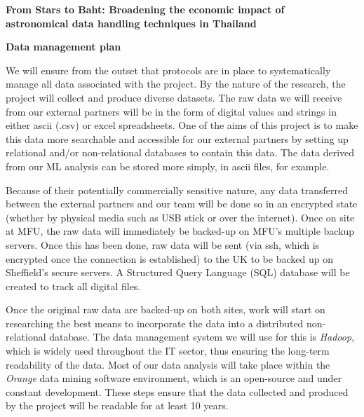 \documentclass[11pt]{article}
\begin{document}
\setcounter{figure}{0}
\noindent
{\LARGE \bf From Stars to Baht: Broadening the economic impact of \\
astronomical data handling techniques in Thailand}

\vspace{3mm}
\noindent
{\LARGE \bf Data management plan}

\vspace{3mm}
\noindent
We will ensure from the outset that protocols are in place to systematically manage all data associated with the project. By the nature of the research, the project will collect and produce diverse datasets. The raw data we will receive from our external partners will be in the form of digital values and strings in either ascii (.csv) or excel spreadsheets. One of the aims of this project is to make this data more searchable and accessible for our external partners by setting up relational and/or non-relational databases to contain this data. The data derived from our ML analysis can be stored more simply, in ascii files, for example. 

\vspace{2mm}
\noindent
Because of their potentially commercially sensitive nature, any data transferred between the external partners and our team will be done so in an encrypted state (whether by physical media such as USB stick or over the internet). Once on site at MFU, the raw data will immediately be backed-up on MFU's multiple backup servers. Once this has been done, raw data will be sent (via ssh, which is encrypted once the connection is established) to the UK to be backed up on Sheffield's secure servers. A Structured Query Language (SQL) database will be created to track all digital files.

\vspace{2mm}
\noindent
Once the original raw data are backed-up on both sites, work will start on researching the best means to incorporate the data into a distributed non-relational database. The data management system we will use for this is {\it Hadoop}, which is widely used throughout the IT sector, thus ensuring the long-term readability of the data. Most of our data analysis will take place within the {\it Orange} data mining software environment, which is an open-source and under constant development. These steps ensure that the data collected and produced by the project will be readable for at least 10 years. 
\end{document}
